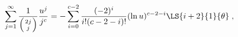 \begin{equation}
\sum_{j=1}^\infty \frac{1}{\left( 2j \atop j\right) } \frac{u^j}{j^c}   = 
 - \sum_{i=0}^{c-2} \frac{(-2)^i}{i! (c-2-i)!} 
( \ln u )^{c-2-i} \LS{i+2}{1}{\theta} \;,
\end{equation}

